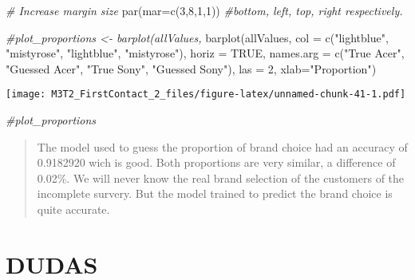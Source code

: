 \documentclass[
]{article}
\newenvironment{Shaded}{\begin{snugshade}}{\end{snugshade}}
\newcommand{\AttributeTok}[1]{\textcolor[rgb]{0.77,0.63,0.00}{#1}}
\newcommand{\CommentTok}[1]{\textcolor[rgb]{0.56,0.35,0.01}{\textit{#1}}}
\newcommand{\ConstantTok}[1]{\textcolor[rgb]{0.00,0.00,0.00}{#1}}
\newcommand{\DecValTok}[1]{\textcolor[rgb]{0.00,0.00,0.81}{#1}}
\newcommand{\FunctionTok}[1]{\textcolor[rgb]{0.00,0.00,0.00}{#1}}
\newcommand{\NormalTok}[1]{#1}
\newcommand{\StringTok}[1]{\textcolor[rgb]{0.31,0.60,0.02}{#1}}
\begin{document}
\begin{Shaded}
\begin{Highlighting}[]
\CommentTok{\# Increase margin size}
\FunctionTok{par}\NormalTok{(}\AttributeTok{mar=}\FunctionTok{c}\NormalTok{(}\DecValTok{3}\NormalTok{,}\DecValTok{8}\NormalTok{,}\DecValTok{1}\NormalTok{,}\DecValTok{1}\NormalTok{)) }\CommentTok{\#bottom, left, top, right respectively.}

\CommentTok{\#plot\_proportions \textless{}{-} barplot(allValues, }
\FunctionTok{barplot}\NormalTok{(allValues, }
  \AttributeTok{col =} \FunctionTok{c}\NormalTok{(}\StringTok{"lightblue"}\NormalTok{, }\StringTok{"mistyrose"}\NormalTok{, }\StringTok{"lightblue"}\NormalTok{, }\StringTok{"mistyrose"}\NormalTok{),}
  \AttributeTok{horiz =} \ConstantTok{TRUE}\NormalTok{, }
  \AttributeTok{names.arg =} \FunctionTok{c}\NormalTok{(}\StringTok{"True Acer"}\NormalTok{, }\StringTok{"Guessed Acer"}\NormalTok{, }\StringTok{"True Sony"}\NormalTok{, }\StringTok{"Guessed Sony"}\NormalTok{), }
  \AttributeTok{las =} \DecValTok{2}\NormalTok{,}
  \AttributeTok{xlab=}\StringTok{"Proportion"}\NormalTok{)}
\end{Highlighting}
\end{Shaded}

\texttt{[image: M3T2\_FirstContact\_2\_files/figure-latex/unnamed-chunk-41-1.pdf]}

\begin{Shaded}
\begin{Highlighting}[]
\CommentTok{\#plot\_proportions}
\end{Highlighting}
\end{Shaded}

\begin{quote}
The model used to guess the proportion of brand choice had an accuracy
of 0.9182920 wich is good. Both proportions are very similar, a
difference of 0.02\%. We will never know the real brand selection of the
customers of the incomplete survery. But the model trained to predict
the brand choice is quite accurate.
\end{quote}

\hypertarget{dudas}{%
\section{DUDAS}\label{dudas}}
\end{document}
